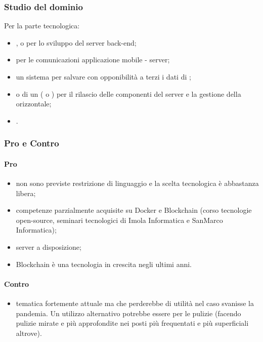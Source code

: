 \subsubsection{Studio del dominio}
Per la parte tecnologica:
\begin{itemize}
\item {},  o  per lo sviluppo del server back-end;
\item {}  per le comunicazioni applicazione mobile - server;
\item un sistema  per salvare con opponibilità a terzi i dati di ;
\item {}  o di un  ( o ) per il rilascio delle componenti del server e la gestione della  orizzontale;
\item {}.
\end{itemize}
\subsubsection{Pro e Contro}
\paragraph*{Pro}
\begin{itemize}
	\item non sono previste restrizione di linguaggio e la scelta tecnologica è abbastanza libera;
	\item competenze parzialmente acquisite su Docker e Blockchain (corso tecnologie open-source, seminari tecnologici di Imola Informatica e SanMarco Informatica);
	\item server a disposizione;
	\item Blockchain è una tecnologia in crescita negli ultimi anni.
\end{itemize}
\paragraph*{Contro}
\begin{itemize}
	\item tematica fortemente attuale ma che perderebbe di utilità nel caso svanisse la pandemia. Un utilizzo alternativo potrebbe essere per le pulizie (facendo pulizie mirate e più approfondite nei posti più frequentati e più superficiali altrove).
\end{itemize}
